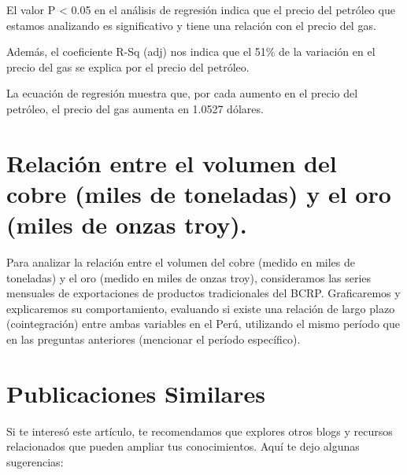 \documentclass[
  stu,
  floatsintext,
  longtable,
  a4paper,
  nolmodern,
  notxfonts,
  notimes,
  12pt,
  colorlinks=true,linkcolor=blue,citecolor=blue,urlcolor=blue]{apa7}
\begin{document}
El valor P \textless{} 0.05 en el análisis de regresión indica que el
precio del petróleo que estamos analizando es significativo y tiene una
relación con el precio del gas.

Además, el coeficiente R-Sq (adj) nos indica que el 51\% de la variación
en el precio del gas se explica por el precio del petróleo.

La ecuación de regresión muestra que, por cada aumento en el precio del
petróleo, el precio del gas aumenta en 1.0527 dólares.

\section{Relación entre el volumen del cobre (miles de toneladas) y el
oro (miles de onzas
troy).}\label{relaciuxf3n-entre-el-volumen-del-cobre-miles-de-toneladas-y-el-oro-miles-de-onzas-troy.}

Para analizar la relación entre el volumen del cobre (medido en miles de
toneladas) y el oro (medido en miles de onzas troy), consideramos las
series mensuales de exportaciones de productos tradicionales del BCRP.
Graficaremos y explicaremos su comportamiento, evaluando si existe una
relación de largo plazo (cointegración) entre ambas variables en el
Perú, utilizando el mismo período que en las preguntas anteriores
(mencionar el período específico).

\section{Publicaciones Similares}\label{publicaciones-similares}

Si te interesó este artículo, te recomendamos que explores otros blogs y
recursos relacionados que pueden ampliar tus conocimientos. Aquí te dejo
algunas sugerencias:
\end{document}
